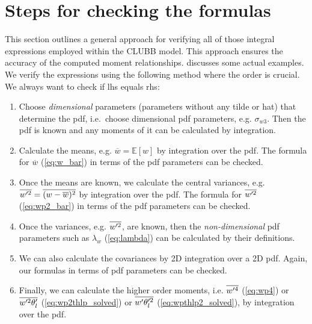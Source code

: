 \section{Steps for checking the formulas}
\label{sec:steps-for-checking-the-formulas}

This section outlines a general approach for verifying all of those integral expressions
employed within the \gls{CLUBB} model.
This approach ensures the accuracy of the computed moment relationships.
 discusses some actual examples.
We verify the expressions using the following method where the order is crucial.
We always want to check if \gls{lhs} equals \gls{rhs}:

\begin{enumerate}
    \item\label{itm:checkingstep_1}
    Choose \emph{dimensional} parameters (parameters without any tilde or hat) that determine the \gls{pdf},
    i.e.\ choose dimensional \gls{pdf} parameters, e.g. $\sigma_{w 3}$.
    Then the \gls{pdf} is known and any moments of it can be calculated by integration.

    \item\label{itm:checkingstep_2}
    Calculate the means, e.g. $\overline{w} = \mathbb{E}[w]$ by integration over the \gls{pdf}.
    The formula for $\overline{w}$ (\cref{eq:w_bar}) in terms of the \gls{pdf} parameters can be checked.

    \item\label{itm:checkingstep_3}
    Once the means are known, we calculate the central variances,
    e.g.  $\overline{w'^2} = \overline{(w-\overline{w})^2}$ by integration over the \gls{pdf}.
    The formula for $\overline{w'^2}$ (\cref{eq:wp2_bar}) in terms of the \gls{pdf} parameters can be checked.

    \item\label{itm:checkingstep_4}
    Once the variances, e.g. $\overline{w'^2}$, are known,
    then the \emph{non-dimensional} \gls{pdf} parameters such as $\lambda_w$ (\cref{eq:lambda})
    can be calculated by their definitions.

    \item\label{itm:checkingstep_5}
    We can also calculate the covariances by 2D integration over a 2D \gls{pdf}.
    Again, our formulas in terms of \gls{pdf} parameters can be checked.

    \item\label{itm:checkingstep_6}
    Finally, we can calculate the higher order moments,
    i.e. $\overline{w'^4}$ (\cref{eq:wp4}) or $\overline{w'^2 \theta_l'}$ (\cref{eq:wp2thlp_solved})
    or $\overline{w' \theta_l'^2}$ (\cref{eq:wpthlp2_solved}),
    by integration over the \gls{pdf}.


\end{enumerate}
